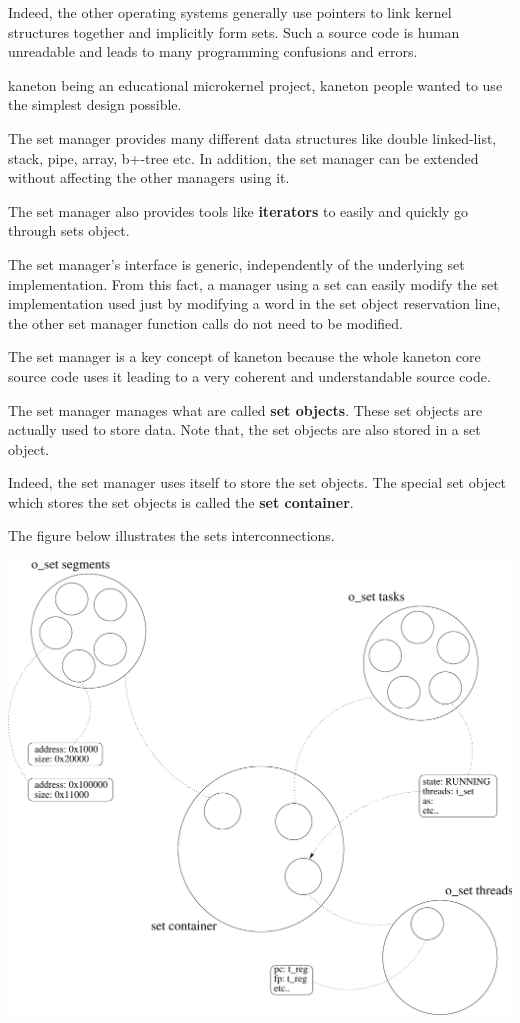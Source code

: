 \begin{multicols}{2}
Indeed, the other operating systems generally use pointers to link kernel
structures together and implicitly form sets. Such a source code is human
unreadable and leads to many programming confusions and errors.

kaneton being an educational microkernel project, kaneton people wanted
to use the simplest design possible.

The set manager provides many different data structures like double
linked-list, stack, pipe, array, b+-tree etc. In addition, the set
manager can be extended without affecting the other managers using it.

The set manager also provides tools like \textbf{iterators} to easily and
quickly go through sets object.

The set manager's interface is generic, independently of the underlying set
implementation. From this fact, a manager using a set can easily modify
the set implementation used just by modifying a word in the set
object reservation line, the other set manager function calls do not
need to be modified.

The set manager is a key concept of kaneton because the whole kaneton
core source code uses it leading to a very coherent and understandable
source code.

The set manager manages what are called \textbf{set objects}. These set
objects are actually used to store data. Note that, the set objects are
also stored in a set object.

Indeed, the set manager uses itself to store the set objects. The special
set object which stores the set objects is called the \textbf{set container}.

The figure below illustrates the sets interconnections.

\end{multicols}

\begin{center}
  \includegraphics[scale=0.5]{figures/sets.pdf}
\end{center}

